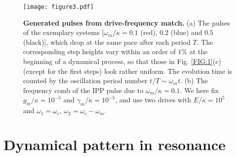 \documentclass[a4paper,fleqn]{cas-dc}
\begin{document}
\begin{figure}
	\centering
		\texttt{[image: figure3.pdf]}
	\caption{{\bf Generated pulses from drive-frequency match.} (a) The pulses of the exemplary systems 
[$\omega_m/\kappa=0.1$ (red), $0.2$ (blue) and $0.5$ (black)], which drop at the same pace after each period $T$. 
The corresponding step heights vary within an order of $1 \%$ at the beginning of a dynamical process, so that those in Fig. \ref{FIG:1}(c) (except for the first steps) look rather uniform. The evolution time is counted by the oscillation period number $t/T\sim \omega_m t$. (b) The frequency comb of the IPP pulse due to $\omega_m/\kappa=0.1$. We here fix $g_m/\kappa=10^{-5}$ and $\gamma_m/\kappa=10^{-5}$, and use two drives with $E/\kappa=10^5$ and $\omega_1=\omega_c$, $\omega_2=\omega_c-\omega_m$.}
	\label{FIG:3}
\end{figure}

\section{Dynamical pattern in resonance}
\end{document}

